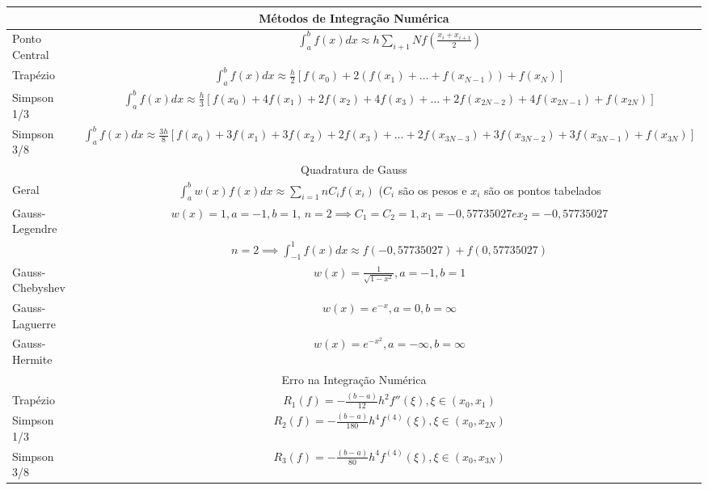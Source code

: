 \documentclass{article}
\begin{document}
\vspace{1em}
\begin{tabularx}{\textwidth}{lc}
\toprule
\multicolumn{2}{c}{Métodos de Integração Numérica}\\
\midrule
Ponto Central & $ \displaystyle \int_a^b f(x) dx \approx h \displaystyle \sum_{i+1}{N} f \left(\frac{x_i + x_{i+1}}{2} \right)$ \\
Trapézio & $ \displaystyle \int_a^b f(x)dx \approx \frac{h}{2} \left[ f(x_0) + 2\left( f(x_1) + \dots + f(x_{N-1}) \right) + f(x_N) \right] $\\

Simpson 1/3 & $ \displaystyle \int_a^b f(x)dx \approx \frac{h}{3} \left[ f(x_0) + 4f(x_1) + 2f(x_2) + 4f(x_3) + \dots + 2f(x_{2N-2}) + 4f(x_{2N-1}) + f(x_{2N}) \right] $\\

Simpson 3/8 & $ \displaystyle \int_a^b f(x)dx \approx \frac{3h}{8} [ f(x_0) + 3f(x_1) + 3f(x_2) + 2f(x_3) + \dots + 2f(x_{3N-3}) + 3f(x_{3N-2}) + 3f(x_{3N-1}) + f(x_{3N}) ] $\\
\midrule
\multicolumn{2}{c}{Quadratura de Gauss}\\
\midrule
Geral & $ \displaystyle \int_a^b w(x)f(x)dx \approx \displaystyle \sum_{i=1}{n} C_if(x_i) $ ($C_i$ são os pesos e $x_i$ são os pontos tabelados \\
Gauss-Legendre & $w(x)=1, a=-1, b=1$, $n=2 \implies C_1 = C_2 = 1, x_1 =-0,57735027 e x_2 = -0,57735027$\\
& $ n=2 \implies \displaystyle \int_{-1}^1 f(x)dx \approx f(-0,57735027) + f(0,57735027) $\\
Gauss-Chebyshev & $w(x) = \frac{1}{\sqrt{1-x^2}}, a=-1, b=1$ \\
Gauss-Laguerre & $ w(x) = e^{-x}, a=0, b=\infty$\\
Gauss-Hermite & $ w(x) = e^{-x^2}, a=-\infty, b=\infty$\\
\midrule
\multicolumn{2}{c}{Erro na Integração Numérica}\\
\midrule
Trapézio & $R_1(f) = -\frac{(b-a)}{12}h^2f''(\xi), \xi \in (x_0,x_1) $\\
Simpson 1/3 & $R_2(f) = -\frac{(b-a)}{180}h^4f^{(4)}(\xi), \xi \in (x_0,x_{2N})$\\
Simpson 3/8 & $R_3(f) = -\frac{(b-a)}{80}h^4f^{(4)}(\xi), \xi \in (x_0,x_{3N})$\\
\bottomrule
\end{tabularx}\\
\end{document}
